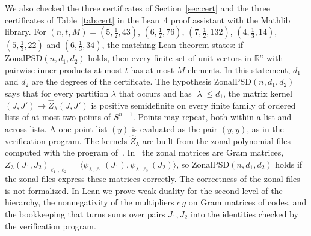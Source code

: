 \documentclass[11pt]{amsart}
\theoremstyle{remark}
\newcommand{\R}{\mathbb{R}}
\begin{document}
We also checked the three certificates of Section~\ref{sec:cert} and the three certificates of Table~\ref{tab:cert} in the Lean~4 proof assistant with the Mathlib library. For $(n,t,M)=(5,\frac12,43)$, $(6,\frac12,76)$, $(7,\frac12,132)$, $(4,\frac13,14)$, $(5,\frac13,22)$ and $(6,\frac13,34)$, the matching Lean theorem states: if $\mathrm{ZonalPSD}(n,d_1,d_2)$ holds, then every finite set of unit vectors in $\R^n$ with pairwise inner products at most $t$ has at most $M$ elements. In this statement, $d_1$ and $d_2$ are the degrees of the certificate. The hypothesis $\mathrm{ZonalPSD}(n,d_1,d_2)$ says that for every partition $\lambda$ that occurs and has $|\lambda|\le d_1$, the matrix kernel $(J,J')\mapsto\hat Z_\lambda(J,J')$ is positive semidefinite on every finite family of ordered lists of at most two points of $S^{n-1}$. Points may repeat, both within a list and across lists. A one-point list $(y)$ is evaluated as the pair $(y,y)$, as in the verification program. The kernels $\hat Z_\lambda$ are built from the zonal polynomial files computed with the program of~\cite{LLMdata}. In~\cite{LLM} the zonal matrices are Gram matrices, $Z_\lambda(J_1,J_2)_{\ell_1,\ell_2}=\langle\psi_{\lambda,\ell_1}(J_1),\psi_{\lambda,\ell_2}(J_2)\rangle$, so $\mathrm{ZonalPSD}(n,d_1,d_2)$ holds if the zonal files express these matrices correctly. The correctness of the zonal files is not formalized. In Lean we prove weak duality for the second level of the hierarchy, the nonnegativity of the multipliers $c\,g$ on Gram matrices of codes, and the bookkeeping that turns sums over pairs $J_1,J_2$ into the identities checked by the verification program.
\end{document}
